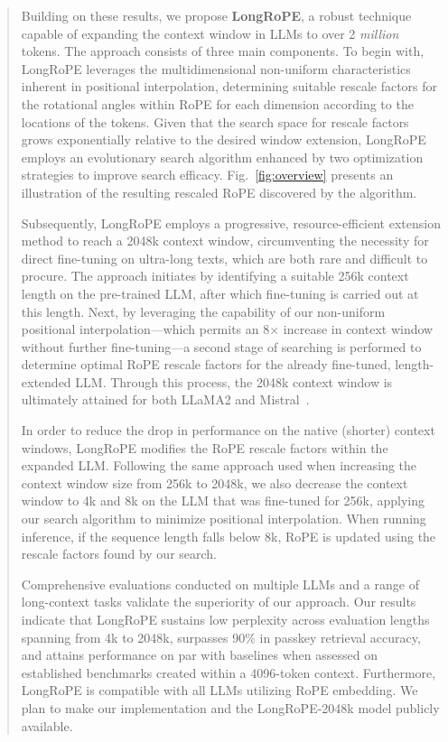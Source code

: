 \begin{abstract}
Building on these results, we propose \textbf{LongRoPE}, a robust technique capable of expanding the context window in LLMs to over 2 \emph{million} tokens. The approach consists of three main components. To begin with, {LongRoPE} leverages the multidimensional non-uniform characteristics inherent in positional interpolation, determining suitable rescale factors for the rotational angles within RoPE for each dimension according to the locations of the tokens. Given that the search space for rescale factors grows exponentially relative to the desired window extension, {LongRoPE} employs an evolutionary search algorithm enhanced by two optimization strategies to improve search efficacy. Fig.~\ref{fig:overview} presents an illustration of the resulting rescaled RoPE discovered by the algorithm.

Subsequently, {LongRoPE} employs a progressive, resource-efficient extension method to reach a 2048k context window, circumventing the necessity for direct fine-tuning on ultra-long texts, which are both rare and difficult to procure. The approach initiates by identifying a suitable 256k context length on the pre-trained LLM, after which fine-tuning is carried out at this length. Next, by leveraging the capability of our non-uniform positional interpolation—which permits an 8$\times$ increase in context window without further fine-tuning—a second stage of searching is performed to determine optimal RoPE rescale factors for the already fine-tuned, length-extended LLM. Through this process, the 2048k context window is ultimately attained for both LLaMA2 and Mistral~\cite{mistral}.

In order to reduce the drop in performance on the native (shorter) context windows, {LongRoPE} modifies the RoPE rescale factors within the expanded LLM. Following the same approach used when increasing the context window size from 256k to 2048k, we also decrease the context window to 4k and 8k on the LLM that was fine-tuned for 256k, applying our search algorithm to minimize positional interpolation. When running inference, if the sequence length falls below 8k, RoPE is updated using the rescale factors found by our search.

Comprehensive evaluations conducted on multiple LLMs and a range of long-context tasks validate the superiority of our approach. Our results indicate that LongRoPE sustains low perplexity across evaluation lengths spanning from 4k to 2048k, surpasses 90\% in passkey retrieval accuracy, and attains performance on par with baselines when assessed on established benchmarks created within a 4096-token context. Furthermore, LongRoPE is compatible with all LLMs utilizing RoPE embedding. We plan to make our implementation and the LongRoPE-2048k model publicly available.


\end{abstract}
